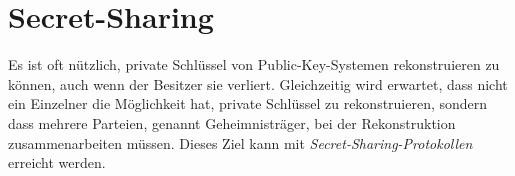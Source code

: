 % 
% 
% 
% 
% 


\section{Secret-Sharing}

Es ist oft nützlich, private Schlüssel von Public-Key-Systemen rekonstruieren zu können, auch wenn der Besitzer sie verliert. Gleichzeitig wird erwartet, dass nicht ein Einzelner die Möglichkeit hat, private Schlüssel zu rekonstruieren, sondern dass mehrere Parteien, genannt Geheimnisträger, bei der Rekonstruktion zusammenarbeiten müssen. Dieses Ziel kann mit \emph{Secret-Sharing-Protokollen} erreicht werden. 

